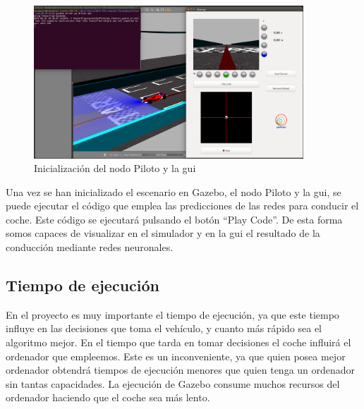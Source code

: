 \begin{figure}
  \begin{center}
    \includegraphics[width=0.9\textwidth]{figures/Infraestructura/driver_node.png}
		\caption{Inicialización del nodo Piloto y la \acrshort{gui}}
		\label{fig.driver_node}
		\end{center}
\end{figure}

Una vez se han inicializado el escenario en Gazebo, el nodo Piloto y la \acrshort{gui}, se puede ejecutar el código que emplea las predicciones de las redes para conducir el coche. Este código se ejecutará pulsando el botón ``Play Code''. De esta forma somos capaces de visualizar en el simulador y en la \acrshort{gui} el resultado de la conducción mediante redes neuronales.\\


\subsection{Tiempo de ejecución}

En el proyecto es muy importante el tiempo de ejecución, ya que este tiempo influye en las decisiones que toma el vehículo, y cuanto más rápido sea el algoritmo mejor. En el tiempo que tarda en tomar decisiones el coche influirá el ordenador que empleemos. Este es un inconveniente, ya que quien posea mejor ordenador obtendrá tiempos de ejecución menores que quien tenga un ordenador sin tantas capacidades. La ejecución de Gazebo consume muchos recursos del ordenador haciendo que el coche sea más lento.\\

